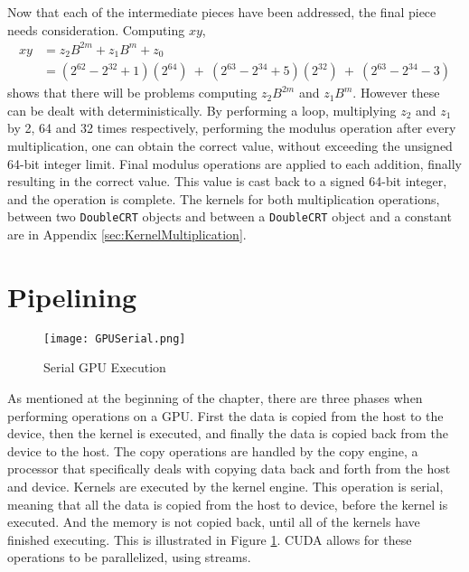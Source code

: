Now that each of the intermediate pieces have been addressed, the final piece needs consideration. Computing $xy$,
\begin{equation}
\begin{split}
xy & = z_2 B^{2m} + z_1 B^{m} + z_0\\
 & = (2^{62} - 2^{32} + 1) (2^{64})\ +\ (2^{63} - 2^{34} + 5) (2^{32})\ +\ (2^{63} - 2^{34} - 3)
\end{split}
\end{equation}
shows that there will be problems computing $z_2 B^{2m}$ and $z_1 B^{m}$. However these can be dealt with deterministically. By performing a loop, multiplying $z_2$ and $z_1$ by 2, 64 and 32 times respectively, performing the modulus operation after every multiplication, one can obtain the correct value, without exceeding the unsigned 64-bit integer limit. Final modulus operations are applied to each addition, finally resulting in the correct value. This value is cast back to a signed 64-bit integer, and the operation is complete. The kernels for both multiplication operations, between two \verb|DoubleCRT| objects and between a \verb|DoubleCRT| object and a constant are in Appendix \ref{sec:KernelMultiplication}.

\section{Pipelining} \label{sec:Pipelining}
\begin{figure}[t!]
\centering
\texttt{[image: GPUSerial.png]}
\caption{Serial GPU Execution}
\label{fig:GPUSerial}
\end{figure}
As mentioned at the beginning of the chapter, there are three phases when performing operations on a GPU. First the data is copied from the host to the device, then the kernel is executed, and finally the data is copied back from the device to the host. The copy operations are handled by the copy engine, a processor that specifically deals with copying data back and forth from the host and device. Kernels are executed by the kernel engine. This operation is serial, meaning that all the data is copied from the host to device, before the kernel is executed. And the memory is not copied back, until all of the kernels have finished executing. This is illustrated in Figure \ref{fig:GPUSerial}. CUDA allows for these operations to be parallelized, using streams.

